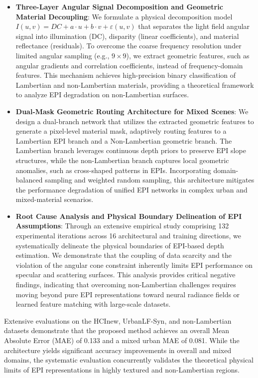\begin{itemize}
 \item \textbf{Three-Layer Angular Signal Decomposition and Geometric Material Decoupling}: We formulate a physical decomposition model $I(u,v) = DC + a \cdot u + b \cdot v + \varepsilon(u,v)$ that separates the light field angular signal into illumination (DC), disparity (linear coefficients), and material reflectance (residuals). To overcome the coarse frequency resolution under limited angular sampling (e.g., $9 \times 9$), we extract geometric features, such as angular gradients and correlation coefficients, instead of frequency-domain features. This mechanism achieves high-precision binary classification of Lambertian and non-Lambertian materials, providing a theoretical framework to analyze EPI degradation on non-Lambertian surfaces.
 \item \textbf{Dual-Mask Geometric Routing Architecture for Mixed Scenes}: We design a dual-branch network that utilizes the extracted geometric features to generate a pixel-level material mask, adaptively routing features to a Lambertian EPI branch and a Non-Lambertian geometric branch. The Lambertian branch leverages continuous depth priors to preserve EPI slope structures, while the non-Lambertian branch captures local geometric anomalies, such as cross-shaped patterns in EPIs. Incorporating domain-balanced sampling and weighted random sampling, this architecture mitigates the performance degradation of unified EPI networks in complex urban and mixed-material scenarios.
 \item \textbf{Root Cause Analysis and Physical Boundary Delineation of EPI Assumptions}: Through an extensive empirical study comprising 132 experimental iterations across 16 architectural and training directions, we systematically delineate the physical boundaries of EPI-based depth estimation. We demonstrate that the coupling of data scarcity and the violation of the angular cone constraint inherently limits EPI performance on specular and scattering surfaces. This analysis provides critical negative findings, indicating that overcoming non-Lambertian challenges requires moving beyond pure EPI representations toward neural radiance fields or learned feature matching with large-scale datasets.
\end{itemize}
Extensive evaluations on the HCInew, UrbanLF-Syn, and non-Lambertian datasets demonstrate that the proposed method achieves an overall Mean Absolute Error (MAE) of 0.133 and a mixed urban MAE of 0.081. While the architecture yields significant accuracy improvements in overall and mixed domains, the systematic evaluation concurrently validates the theoretical physical limits of EPI representations in highly textured and non-Lambertian regions.